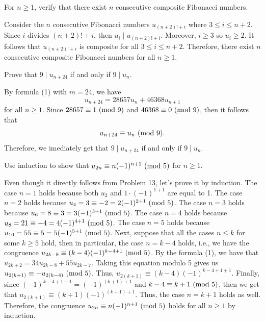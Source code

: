 \begin{exercise}
    For $n \geq 1$, verify that there exist $n$ consecutive composite Fibonacci numbers. \\
\end{exercise}

\begin{solution}
    Consider the $n$ consecutive Fibonacci numbers $u_{(n+2)! + i}$ where $3 \leq i \leq n+2$. Since $i$ divides $(n+2)! + i$, then $u_i \mid u_{(n+2)! + i}$. Moreover, $i \geq 3$ so $u_i \geq 2$. It follows that $u_{(n+2)! + i}$ is composite for all $3 \leq i \leq n+2$. Therefore, there exist $n$ consecutive composite Fibonacci numbers for all $n \geq 1$. \\
\end{solution}

\begin{exercise}
    Prove that $9 \mid u_{n + 24}$ if and only if $9 \mid u_n$.  \\
\end{exercise}

\begin{solution}
    By formula (1) with $m = 24$, we have
    $$u_{n+24} = 28657u_n + 46368u_{n+1}$$
    for all $n \geq 1$. Since $28657 \equiv 1 \ (\mathrm{mod}\ 9)$ and $46368 \equiv 0 \ (\mathrm{mod}\ 9)$, then it follows that
    $$u_{n+24} \equiv u_n \ (\mathrm{mod}\ 9).$$
    Therefore, we imediately get that $9 \mid u_{n + 24}$ if and only if $9 \mid u_n$. \\
\end{solution}

\begin{exercise}
    Use induction to show that $u_{2n} \equiv n(-1)^{n+1} \ (\mathrm{mod}\ 5)$ for $n \geq 1$. \\
\end{exercise}

\begin{solution}
    Even though it directly follows from Problem 13, let's prove it by induction. The case $n = 1$ holds because both $u_2$ and $1\cdot (-1)^{1 + 1}$ are equal to 1. The case $n = 2$ holds because $u_4 = 3 \equiv -2 = 2(-1)^{2 + 1} \ (\mathrm{mod}\ 5)$. The case $n = 3$ holds because $u_6 = 8 \equiv 3 = 3(-1)^{3 + 1} \ (\mathrm{mod}\ 5)$. The case $n = 4$ holds because $u_8 = 21 \equiv -4 = 4(-1)^{4 + 1} \ (\mathrm{mod}\ 5)$. The case $n = 5$ holds because $u_{10} = 55 \equiv 5 = 5(-1)^{5 + 1} \ (\mathrm{mod}\ 5)$. Next, suppose that all the cases $n \leq k$ for some $k \geq 5$ hold, then in particular, the case $n = k - 4$ holds, i.e., we have the congruence $u_{2k - 8} \equiv (k-4)(-1)^{k-4 + 1} \ (\mathrm{mod}\ 5)$. By the formula (1), we have that $u_{2k + 2} = 34u_{2k - 8} + 55u_{2k - 7}$. Taking this equation modulo 5 gives us $u_{2(k+1)} \equiv -u_{2(k-4)} \ (\mathrm{mod}\ 5)$. Thus, $u_{2(k+1)} \equiv (k-4)(-1)^{k-4 + 1 + 1}$. Finally, since $(-1)^{k-4 + 1 + 1} = (-1)^{(k + 1) + 1}$ and $k-4 \equiv k + 1\ (\mathrm{mod}\ 5)$, then we get that $u_{2(k+1)} \equiv (k+1)(-1)^{(k+1) + 1}$. Thus, the case $n = k+1$ holds as well. Therefore, the congruence $u_{2n} \equiv n(-1)^{n+1} \ (\mathrm{mod}\ 5)$ holds for all $n \geq 1$ by induction. \\
\end{solution}

